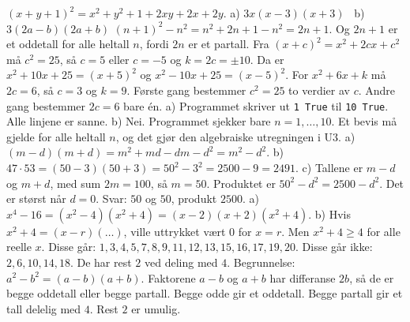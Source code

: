  $(x+y+1)^2 = x^2 + y^2 + 1 + 2xy + 2x + 2y$.
 a) $3x(x-3)(x+3)$ \ b) $3(2a-b)(2a+b)$
 $(n+1)^2 - n^2 = n^2 + 2n + 1 - n^2 = 2n + 1$. Og $2n + 1$ er et oddetall for alle heltall $n$, fordi $2n$ er et partall.
 Fra $(x+c)^2 = x^2 + 2cx + c^2$ må $c^2 = 25$, så $c = 5$ eller $c = -5$ og $k = 2c = \pm 10$. Da er $x^2 + 10x + 25 = (x+5)^2$ og $x^2 - 10x + 25 = (x-5)^2$.
For $x^2 + 6x + k$ må $2c = 6$, så $c = 3$ og $k = 9$. Første gang bestemmer $c^2 = 25$ to verdier av $c$. Andre gang bestemmer $2c = 6$ bare én.
 a) Programmet skriver ut \texttt{1 True} til \texttt{10 True}. Alle linjene er sanne.
b) Nei. Programmet sjekker bare $n = 1, \ldots, 10$. Et bevis må gjelde for alle heltall $n$, og det gjør den algebraiske utregningen i U3.
 a) $(m-d)(m+d) = m^2 + md - dm - d^2 = m^2 - d^2$.
b) $47 \cdot 53 = (50-3)(50+3) = 50^2 - 3^2 = 2500 - 9 = 2491$.
c) Tallene er $m - d$ og $m + d$, med sum $2m = 100$, så $m = 50$. Produktet er $50^2 - d^2 = 2500 - d^2$. Det er størst når $d = 0$. Svar: $50$ og $50$, produkt $2500$.
 a) $x^4 - 16 = (x^2-4)(x^2+4) = (x-2)(x+2)(x^2+4)$.
b) Hvis $x^2 + 4 = (x-r)(\ldots)$, ville uttrykket vært $0$ for $x = r$. Men $x^2 + 4 \geq 4$ for alle reelle $x$.
 Disse går: $1, 3, 4, 5, 7, 8, 9, 11, 12, 13, 15, 16, 17, 19, 20$. Disse går ikke: $2, 6, 10, 14, 18$. De har rest $2$ ved deling med $4$.
Begrunnelse: $a^2 - b^2 = (a-b)(a+b)$. Faktorene $a-b$ og $a+b$ har differanse $2b$, så de er begge oddetall eller begge partall. Begge odde gir et oddetall. Begge partall gir et tall delelig med $4$. Rest $2$ er umulig.
